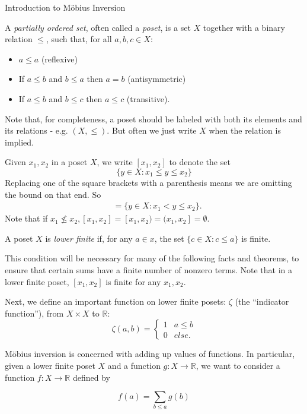 \documentclass[12pt]{pom_thesis}
\newcommand{\Rr}{\mathbb{R}}
\begin{document}
\begin{chapter}{Introduction to M\"obius Inversion}
\begin{defn}
A \emph{partially ordered set}, often called a \emph{poset}, is a set $X$ together with a binary relation $\leq$, such that, for all $a,b,c \in X$:
\begin{itemize}
\item $a \leq a$ (reflexive)
\item If $a \leq b$ and $b \leq a$ then $a = b$ (antisymmetric)
\item If $a \leq b$ and $b \leq c$ then $a \leq c$ (transitive).
\end{itemize}
\end{defn}
Note that, for completeness, a poset should be labeled with both its elements and its relations - e.g. $(X, \leq)$. But often we just write $X$ when the relation is implied.
\begin{rmk}
Given $x_1, x_2$ in a poset $X$, we write $[x_1, x_2]$ to denote the set 
\[
\{y \in X: x_1 \leq y \leq x_2\}
\]
Replacing one of the square brackets with a parenthesis means we are omitting the bound on that end. So
\begin{align*}
[x_1, x_2) &= \{y \in X: x_1 \leq y < x_2\},\\
(x_1, x_2] &= \{y \in X: x_1 < y \leq x_2\}.
\end{align*}
Note that if $x_1 \nleq x_2, [x_1, x_2] = [x_1, x_2) = (x_1, x_2]= \emptyset.$
\end{rmk}
\begin{defn}
A poset $X$ is \emph{lower finite} if, for any $a \in x$, the set $\{ c \in X: c \leq a\}$ is finite.
\end{defn}
This condition will be necessary for many of the following facts and theorems, to ensure that certain sums have a finite number of nonzero terms. Note that in a lower finite poset, $[x_1, x_2]$ is finite for any $x_1, x_2$.

Next, we define an important function on lower finite posets: $\zeta$ (the ``indicator function''), from $X \times X$ to $\Rr$:
\[
\zeta(a,b) = \begin{cases} 1 & a \leq b \\ 0 & else. \end{cases}
\]

M\"obius inversion is concerned with adding up values of functions. In particular, given a lower finite poset $X$ and a function $g:X \rightarrow \Rr$, we want to consider a function $f:X \rightarrow \Rr$ defined by

\[
f(a) = \sum_{b \leq a}g(b)
\]


\end{chapter}
\end{document}
